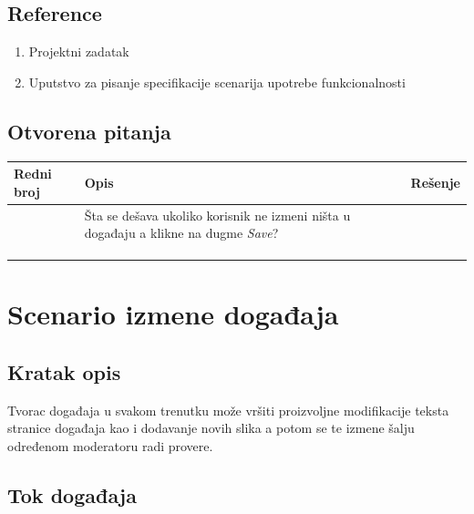 \documentclass[11pt,a4paper]{article}
\begin{document}
\subsection{Reference}
\begin{enumerate}
    \item Projektni zadatak
    \item Uputstvo za pisanje specifikacije scenarija upotrebe funkcionalnosti
\end{enumerate}
\subsection{Otvorena pitanja}
\begin{center}
\begin{tabular}{| >{\centering\arraybackslash}m{1.9cm} | >{\centering\arraybackslash}m{4.9cm} | >{\centering\arraybackslash}m{4.9cm} |}
\hline
\rowcolor[HTML]{000000} 
{\color[HTML]{FFFFFF} Redni broj } & {\color[HTML]{FFFFFF} Opis } & {\color[HTML]{FFFFFF} Rešenje } \\ \hline
 1 & Šta se dešava ukoliko korisnik ne izmeni ništa u događaju a klikne na dugme \textit{Save}? & \\ \hline
 &  &  \\ \hline
 &  &  \\ \hline
 &  &  \\ \hline
\end{tabular}
\end{center}

\newpage

\section{Scenario izmene događaja}
\subsection{Kratak opis}
Tvorac događaja u svakom trenutku može vršiti proizvoljne modifikacije teksta stranice događaja kao i dodavanje novih slika a potom se te izmene šalju određenom moderatoru radi provere.
\subsection{Tok događaja}
\end{document}
